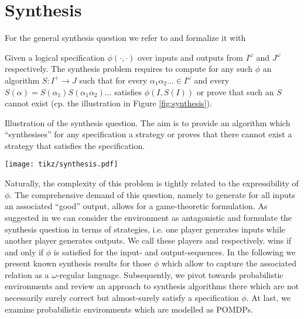 \chapter{Synthesis}
\label{chapter:synthesis}
For the general synthesis question we refer to \cite{Church} and formalize it
with 
\begin{definition}
  Given a logical specification  $\phi(\cdot, \cdot)$ over inputs and 
  outputs from $I^{\omega}$ and $J^{\omega}$ respectively. The synthesis 
  problem requires to compute for any such $\phi$ an algorithm 
  $S:I^{+}\rightarrow J$ such that for every 
  $\alpha_{1}\alpha_{2}\dots\in I^{\omega}$ and every 
  $S(\alpha) = S(\alpha_{1})S(\alpha_{1}\alpha_{2})\dots$ satisfies 
  $\phi(I, S(I))$ or prove that such an $S$ cannot exist (cp. the 
  illustration in Figure \ref{fig:synthesis}).
\end{definition}
\begin{drawing}
  \caption{Illustration of the synthesis question. The aim is to provide an 
  algorithm which \enquote{synthesises} for any specification a strategy or 
  proves that there cannot exist a strategy that satisfies the specification.}
  \label{fig:synthesis}
  \begin{center}
    \texttt{[image: tikz/synthesis.pdf]}
  \end{center}
\end{drawing}
Naturally, the complexity of this problem is tightly related to the 
expressibility of $\phi$. The comprehensive demand of this question, namely
to generate for all inputs an associated \enquote{good} output, allows for a
game-theoretic formulation. As suggested in \cite{SeqCondStrat} we can consider
the environment as antagonistic and formulate the synthesis question in terms
of strategies, i.e. one player generates inputs while another player generates
outputs. We call these players  and \outputp{} respectively. \outputp 
wins if and only if $\phi$ is satisfied for the input- and output-sequences. In 
the following we present known synthesis results for those $\phi$ which allow 
to capture the associated relation as a $\omega$-regular language. 
Subsequently, we pivot towards probabilistic environments and review an 
approach to synthesis algorithms there which are not necessarily surely 
correct but almost-surely satisfy a specification $\phi$. At last, we examine 
probabilistic environments which are modelled as \acp{POMDP}. 

